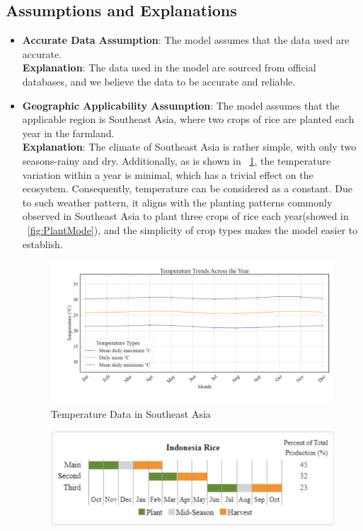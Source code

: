 \documentclass{HZNUMCM}
\begin{document}
    \subsection{Assumptions and Explanations}
      \begin{itemize}
        \item \textbf{Accurate Data Assumption}: The model assumes that the data used are accurate.\\
        \textbf{Explanation}: The data used in the model are sourced from official databases, and we believe the data to be accurate and reliable.
        \item \textbf{Geographic Applicability Assumption}: The model assumes that the applicable region is Southeast Asia,
         where two crops of rice are planted each year in the farmland.\\
        \textbf{Explanation}: The climate of Southeast Asia is rather simple, 
        with only two seasons-rainy and dry. Additionally, as is shown in \figurename~\ref{fig:Temperature},
        the temperature variation within a year is minimal, which has a trivial effect on the ecosystem.
        Consequently, temperature can be considered as a constant.
        Due to such weather pattern, it aligns with the planting patterns commonly observed in Southeast Asia to plant three crops of rice each year(showed in \figurename~\ref{fig:PlantMode}),
         and the simplicity of crop types makes the model easier to establish.
        \begin{figure}[H]
          \centering
          \includegraphics[width=0.75\linewidth]{images/AverTemper.png}
          \caption{Temperature Data in Southeast Asia\cite{IndoTemper}}
          \label{fig:Temperature}
        \end{figure}
        \begin{figure}[H]
          \centering
          \includegraphics[width=0.75\linewidth]{images/PlantMode.jpg}

\end{figure}
\end{itemize}
\end{document}

